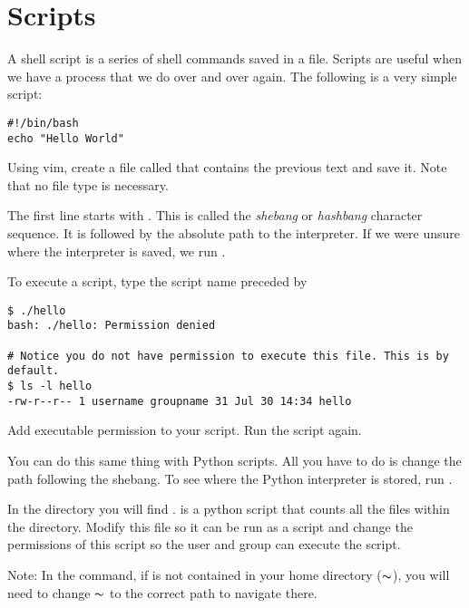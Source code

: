\section*{Scripts}

A shell script is a series of shell commands saved in a file.
Scripts are useful when we have a process that we do over and over again.
The following is a very simple script:

\begin{lstlisting}
#!/bin/bash
echo "Hello World"
\end{lstlisting}

\begin{problem}
Using vim, create a file called  that contains the previous text and save it.
Note that no file type is necessary.
\end{problem}

The first line starts with .
This is called the \emph{shebang} or \emph{hashbang} character sequence.
It is followed by the absolute path to the  interpreter.
If we were unsure where the  interpreter is saved, we run .

To execute a script, type the script name preceded by 

\begin{lstlisting}
$ ./hello
bash: ./hello: Permission denied

# Notice you do not have permission to execute this file. This is by default.
$ ls -l hello
-rw-r--r-- 1 username groupname 31 Jul 30 14:34 hello
\end{lstlisting}

\begin{problem}
Add executable permission to your  script.
Run the script again.
\end{problem}

You can do this same thing with Python scripts.
All you have to do is change the path following the shebang.
To see where the Python interpreter is stored, run .

\begin{problem}
In the  directory you will find .
 is a python script that counts all the files within the  directory.
Modify this file so it can be run as a script and change the permissions of this script so the user and group can execute the script.

Note: In the  command, if  is not contained in your home directory ($\thicksim$), you will need to change $\thicksim$ to the correct path to navigate there.
\end{problem}

